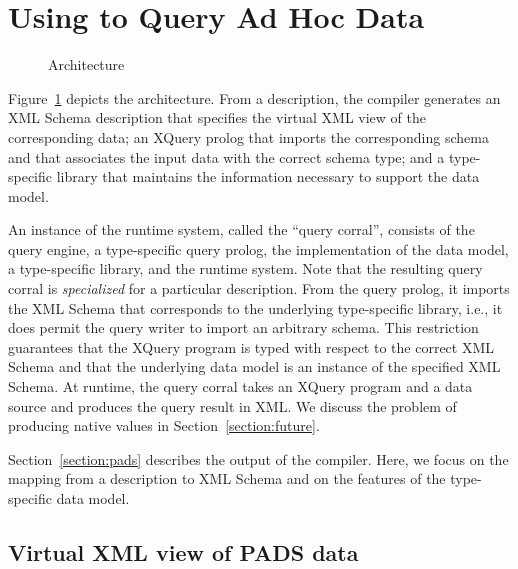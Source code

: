 \section{Using \padx{} to Query Ad Hoc Data}
\label{section:padx}

\begin{figure}
\begin{center}
\end{center}
\caption{\padx{} Architecture}
\label{figure:padx-arch}
\end{figure}

Figure~\ref{figure:padx-arch} depicts the \padx{} architecture.  From
a \pads{} description, the compiler generates an XML Schema
description that specifies the virtual XML view of the corresponding
\pads{} data; an XQuery prolog that imports the corresponding schema
and that associates the input data with the correct schema type; and a
type-specific library that maintains the information necessary to
support the \padx{} data model.

An instance of the \padx{} runtime system, called the ``query
corral'', consists of the \Galax{} query engine, a type-specific query
prolog, the \padx{} implementation of the \Galax{} data model, a
type-specific \padx{} library, and the \pads{} runtime system.  Note
that the resulting query corral is \emph{specialized} for a particular
\pads{} description.  From the query prolog, it imports the XML Schema
that corresponds to the underlying type-specific library, i.e., it
does permit the query writer to import an arbitrary schema.  This
restriction guarantees that the XQuery program is typed with respect
to the correct XML Schema and that the underlying data model is an
instance of the specified XML Schema.  At runtime, the query corral
takes an XQuery program and a \pads{} data source and produces the
query result in XML.  We discuss the problem of producing native
\pads{} values in Section~\ref{section:future}. 

Section~\ref{section:pads} describes the output of the \pads{}
compiler.  Here, we focus on the mapping from a description to XML
Schema and on the features of the type-specific data model.

\subsection{Virtual XML view of PADS data}

